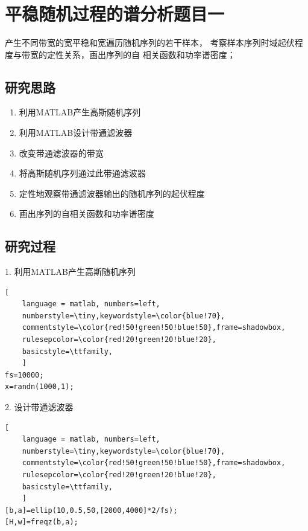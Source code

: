 \documentclass[UTF-8, a4paper, 12pt]{ctexart}
\title{\bfseries \Huge  }
\author{}
\date{}
\begin{document}




\tableofcontents
\newpage

\section{平稳随机过程的谱分析题目一}

产生不同带宽的宽平稳和宽遍历随机序列的若干样本，
    考察样本序列时域起伏程度与带宽的定性关系，画出序列的自
    相关函数和功率谱密度；

\subsection{研究思路}
\begin{enumerate}
    \item 利用MATLAB产生高斯随机序列
    \item 利用MATLAB设计带通滤波器
    \item 改变带通滤波器的带宽
    \item 将高斯随机序列通过此带通滤波器
    \item 定性地观察带通滤波器输出的随机序列的起伏程度
    \item 画出序列的自相关函数和功率谱密度
\end{enumerate}
\subsection{研究过程}

1. 利用MATLAB产生高斯随机序列
\begin{lstlisting}[
	language = matlab, numbers=left, 
	numberstyle=\tiny,keywordstyle=\color{blue!70},
	commentstyle=\color{red!50!green!50!blue!50},frame=shadowbox,
	rulesepcolor=\color{red!20!green!20!blue!20},
	basicstyle=\ttfamily,
	]
fs=10000;
x=randn(1000,1);
\end{lstlisting}

2. 设计带通滤波器
\begin{lstlisting}[
	language = matlab, numbers=left, 
	numberstyle=\tiny,keywordstyle=\color{blue!70},
	commentstyle=\color{red!50!green!50!blue!50},frame=shadowbox,
	rulesepcolor=\color{red!20!green!20!blue!20},
	basicstyle=\ttfamily,
	]
[b,a]=ellip(10,0.5,50,[2000,4000]*2/fs);
[H,w]=freqz(b,a);
\end{lstlisting}
\end{document}
